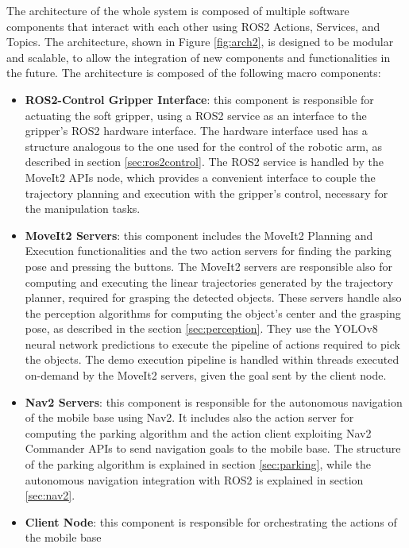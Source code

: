 The architecture of the whole system is composed of multiple software components that interact with each other
using ROS2 Actions, Services, and Topics. The architecture, shown in Figure \ref{fig:arch2}, is designed to be modular
and scalable, to allow the integration of new components and functionalities in the future.
The architecture is composed of the following macro components:

\begin{itemize}
    \item \textbf{ROS2-Control Gripper Interface}: this component is responsible for actuating the soft gripper,
    using a ROS2 service as an interface to the gripper's ROS2 hardware interface. The hardware interface
    used has a structure analogous to the one used for the control of the robotic arm, as described in 
    section \ref{sec:ros2control}. The ROS2 service is handled by the MoveIt2 APIs node, which provides
    a convenient interface to couple the trajectory planning and execution with the gripper's control,
    necessary for the manipulation tasks.
    \item \textbf{MoveIt2 Servers}: this component includes the MoveIt2 Planning and Execution functionalities
    and the two action servers for finding the parking pose and pressing the buttons. The MoveIt2 servers
    are responsible also for computing and executing the linear trajectories generated by the trajectory planner,
    required for grasping the detected objects. These servers handle also the perception algorithms for computing
    the object's center and the grasping pose, as described in the section \ref{sec:perception}.
    They use the YOLOv8 neural network predictions to execute the pipeline of actions required to pick the objects. 
    The demo execution pipeline is handled within threads executed
    on-demand by the MoveIt2 servers, given the goal sent by the client node.
    \item \textbf{Nav2 Servers}: this component is responsible for the autonomous navigation of the mobile base
    using Nav2. It includes also the action server for computing the parking algorithm and the action client
    exploiting Nav2 Commander APIs to send navigation goals to the mobile base. The structure of the parking algorithm
    is explained in section \ref{sec:parking}, while the autonomous navigation integration with ROS2 is explained
    in section \ref{sec:nav2}.
    \item \textbf{Client Node}: this component is responsible for orchestrating the actions of the mobile base

\end{itemize}
